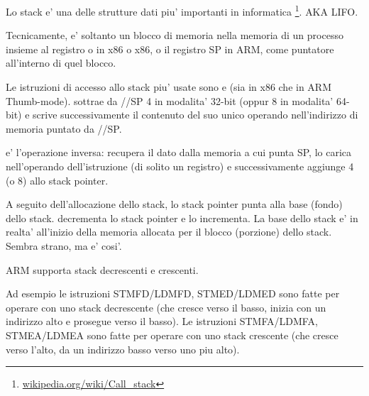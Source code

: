 \mysection{\Stack}
\label{sec:stack}
\myindex{\Stack}

Lo stack e' una delle strutture dati piu' importanti in informatica
\footnote{\href{http://go.yurichev.com/17119}{wikipedia.org/wiki/Call\_stack}}.
\ac{AKA} \ac{LIFO}.

Tecnicamente, e' soltanto un blocco di memoria nella memoria di un processo insieme al registro \ESP o \RSP in x86 o x86, o il registro \ac{SP} in ARM, come puntatore all'interno di quel blocco.

Le istruzioni di accesso allo stack piu' usate sono \PUSH e \POP (sia in x86 che in ARM Thumb-mode).
\PUSH sottrae da \ESP/\RSP/\ac{SP} 4 in modalita' 32-bit (oppur 8 in modalita' 64-bit) e scrive successivamente il contenuto del suo unico operando nell'indirizzo di memoria puntato da \ESP/\RSP/\ac{SP}.

\POP e' l'operazione inversa: recupera il dato dalla memoria a cui punta \ac{SP}, lo carica nell'operando dell'istruzione (di solito un registro)
e successivamente aggiunge 4 (o 8) allo \gls{stack pointer}.

A seguito dell'allocazione dello stack, lo \gls{stack pointer} punta alla base (fondo) dello stack.
\PUSH decrementa lo \gls{stack pointer} e \POP lo incrementa.
La base dello stack e' in realta' all'inizio della memoria allocata per il blocco (porzione) dello stack. Sembra strano, ma e' cosi'.

ARM supporta stack decrescenti e crescenti.


Ad esempio le istruzioni \ac{STMFD}/\ac{LDMFD}, \ac{STMED}/\ac{LDMED} sono fatte per operare con uno stack decrescente (che cresce verso il basso, inizia con un indirizzo alto e prosegue verso il basso).
Le istruzioni \ac{STMFA}/\ac{LDMFA}, \ac{STMEA}/\ac{LDMEA} sono fatte per operare con uno stack crescente (che cresce verso l'alto, da un indirizzo basso verso uno piu alto).


